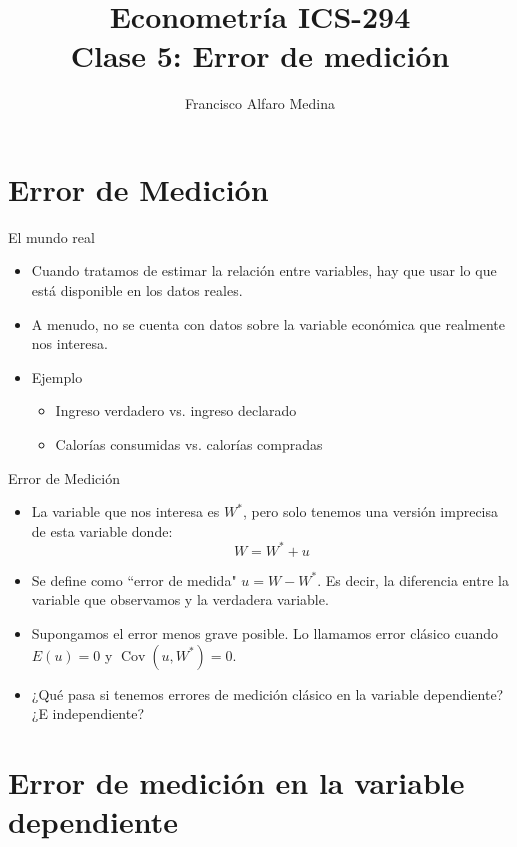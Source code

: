 \documentclass[10pt]{beamer}
\title[ICS-294]{Econometría ICS-294\\ \small{Clase 5: Error de medición}}
\author{Francisco Alfaro Medina}
\institute[USM]
{Universidad Técnica Federico Santa María\\ %
	\medskip
	\textit{} %
	
}
\date{}
\begin{document}
	
\begin{frame}
	\titlepage %
\end{frame}

\section{Error de Medición}

\begin{frame}{El mundo real}
    \begin{itemize}
       
        \item Cuando tratamos de estimar la relación entre variables, hay que usar lo que está disponible en los datos reales. 
        \item A menudo, no se cuenta con datos sobre la variable económica que realmente nos interesa.
        \item Ejemplo
        \begin{itemize}
            \item Ingreso verdadero vs. ingreso declarado
            \item Calor\'ias consumidas vs. calor\'ias compradas
        \end{itemize}
        
    \end{itemize}
\end{frame}

\begin{frame}{Error de Medición}
    \begin{itemize}
        \item La variable que nos interesa es $W^{*}$, pero solo tenemos una versión imprecisa de esta variable donde:
$$
W=W^{*}+u
$$
\item Se define como ``error de medida" $u=W-W^{*}$. Es decir, la diferencia entre la variable que observamos y la verdadera variable.
\item Supongamos el error menos grave posible. Lo llamamos error cl\'asico cuando $E(u)=0$ y $\operatorname{Cov}(u, W^{*})=0$.
\item ¿Qué pasa si tenemos errores de medición cl\'asico en la variable dependiente? ¿E independiente?
    \end{itemize}
\end{frame}

\section{Error de medición en la variable dependiente}
\end{document}
